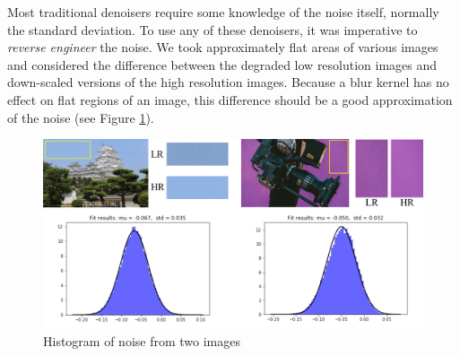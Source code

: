 \documentclass[10pt,twocolumn,letterpaper]{article}
\begin{document}


Most traditional denoisers require some knowledge of the noise itself, normally the standard deviation. To use any of these denoisers, it was imperative to \textit{reverse engineer} the noise. We took approximately flat areas of various images and considered the difference between the degraded low resolution images and down-scaled versions of the high resolution images. Because a blur kernel has no effect on flat regions of an image, this difference should be a good approximation of the noise (see Figure \ref{fig:hist}).
\begin{figure}
    \centering
    \includegraphics[width=\columnwidth]{Images/NOISE.png}
    \caption{Histogram of noise from two images}
    \label{fig:hist}
\end{figure}

\end{document}
